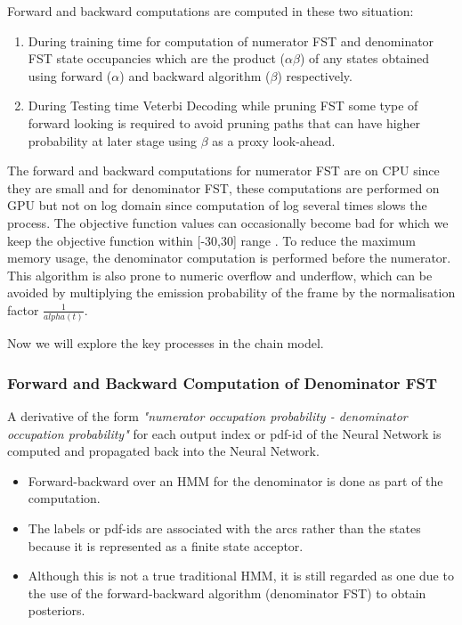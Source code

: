Forward and backward computations are computed in these two situation:
\begin{enumerate}
    \item During training time for computation of numerator FST and denominator FST state occupancies which are the product ($\alpha \beta$) of any states obtained using forward ($\alpha$) and backward algorithm ($\beta$) respectively.
    \item During Testing time Veterbi Decoding while pruning FST some type of forward looking is required to avoid pruning paths that can have higher probability at later stage using $\beta$ as a proxy look-ahead. 
\end{enumerate}

The forward and backward computations for numerator FST are on CPU since they are small and for denominator FST, these computations are performed on GPU but not on log domain since computation of log several times slows the process. The objective function values can occasionally become bad for which we keep the objective function within [-30,30] range \cite{raj_experiments_nodate}. To reduce the maximum memory usage, the denominator computation is performed before the numerator. This algorithm is also prone to numeric overflow and underflow, which can be avoided by multiplying the emission probability of the frame by the normalisation factor $\frac{1}{alpha(t)}$.

Now we will explore the key processes in the chain model.

\subsubsection{Forward and Backward Computation of Denominator FST} 

A derivative of the form \textit{"numerator occupation probability - denominator occupation probability"} for each output index or pdf-id of the Neural Network is computed and propagated back into the Neural Network. 
    \begin{itemize}
        \item Forward-backward over an HMM for the denominator is done as part of the computation. 
        \item The labels or pdf-ids are associated with the arcs rather than the states because it is represented as a finite state acceptor. 
        \item Although this is not a true traditional HMM, it is still regarded as one due to the use of the forward-backward algorithm (denominator FST) to obtain posteriors.
    \end{itemize}    
